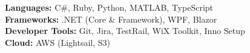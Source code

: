 \textbf{Languages:} C\#, Ruby, Python, MATLAB, TypeScript\\
\textbf{Frameworks:} .NET (Core \& Framework), WPF, Blazor \\
\textbf{Developer Tools:} Git, Jira, TestRail, WiX Toolkit, Inno Setup\\
\textbf{Cloud:} AWS (Lightsail, S3)